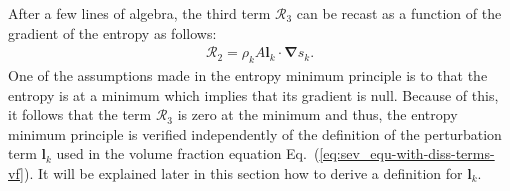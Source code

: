 \documentclass[preprint,10pt]{elsarticle}
\newcommand{\grad}{\mbold{\nabla}}
\newcommand{\mbold}[1]{\boldsymbol#1}
\newcommand{\eqt}[1]{Eq.~(\ref{#1})}                     %
\begin{document}
%
After a few lines of algebra, the third term ${\mathcal{R}_3}$ can be recast as a function of the gradient of the entropy as follows:
\begin{align}
 \label{eq:ent-R3-sct4}
  \mathcal{R}_2  =  \rho_k A \mbold l_k \cdot \grad s_k.
\end{align} 
One of the assumptions made in the entropy minimum principle is to that the entropy 
is at a minimum which implies that its gradient is null. Because of this, it follows that
the term $\mathcal{R}_3$ is zero at the minimum and thus, the entropy minimum principle is verified
independently of the definition of the perturbation term $\mbold l_k$ used in the volume fraction
equation \eqt{eq:sev_equ-with-diss-terms-vf}. It will be explained later in this section how to derive a definition for $\mbold l_k$.
\end{document}
